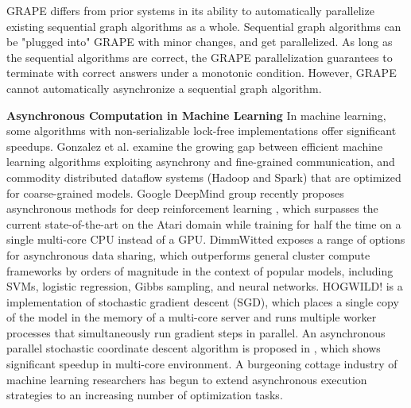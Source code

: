 
GRAPE \cite{Fan:2017:PSG:3035918.3035942} differs from prior systems in its ability to automatically parallelize existing sequential graph algorithms as a whole. Sequential graph algorithms can be "plugged into" GRAPE with minor changes, and get parallelized. As long as the sequential algorithms are correct, the GRAPE parallelization guarantees to terminate with correct answers under a monotonic condition. However, GRAPE cannot automatically asynchronize a sequential graph algorithm.


\noindent\textbf{Asynchronous Computation in Machine Learning} In machine learning, some algorithms with non-serializable lock-free implementations offer significant speedups. Gonzalez et al. \cite{DBLP:journals/corr/GonzalezBJFHGS15} examine the growing gap between efficient machine learning algorithms exploiting asynchrony and fine-grained communication, and commodity distributed dataflow systems (Hadoop and Spark) that are optimized for coarse-grained models. Google DeepMind group recently proposes asynchronous methods for deep reinforcement learning \cite{Mnih:2016:AMD:3045390.3045594}, which surpasses the current state-of-the-art on the Atari domain while training for half the time on a single multi-core CPU instead of a GPU. DimmWitted \cite{Zhang:2014:DSM:2732977.2733001} exposes a range of options for asynchronous data sharing, which outperforms general cluster compute frameworks by orders of magnitude in the context of popular models, including SVMs, logistic regression, Gibbs sampling, and neural networks. HOGWILD! \cite{Niu:2011:HLA:2986459.2986537} is a implementation of stochastic gradient descent (SGD), which places a single copy of the model in the memory of a multi-core server and runs multiple worker processes that simultaneously run gradient steps in parallel. An asynchronous parallel stochastic coordinate descent algorithm is proposed in \cite{Liu:2015:APS:2789272.2789282}, which shows significant speedup in multi-core environment. A burgeoning cottage industry of machine learning researchers has begun to extend asynchronous execution strategies to an increasing number of optimization tasks.

